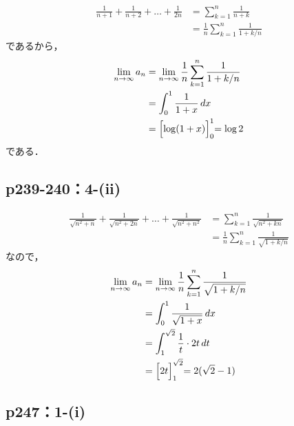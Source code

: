 \documentclass[uplatex,dvipdfmx,a4paper,10pt,fleqn]{jsarticle}
\begin{document}
\begin{tleftbar}
    \begin{align*} 
        \frac{1}{n+1}+ \frac{1}{n+2}+\dots + \frac{1}{2n} & = \sum_{k=1}^{n} \frac{1}{n+k} \\
        & = \frac{1}{n} \sum_{k=1}^{n} \frac{1}{1+k/n} 
    \end{align*}
    であるから，
    \begin{align*} 
        \lim_{n \to \infty} a_n &= \lim_{n \to \infty} \frac{1}{n} \sum_{k=1}^{n} \frac{1}{1+k/n} \\
        & = \int_{0}^{1} \frac{1}{1+x} \, dx \\
        & = \Bigl [ \log (1+x) \Bigl]_{0}^{1} = \log 2
    \end{align*}
    である．
\end{tleftbar}



\subsection*{p239-240：4-(ii)}

\begin{tleftbar}
    \begin{align*} 
        \frac{1}{\sqrt{n^2+n}}+\frac{1}{\sqrt{n^2+2n}}+\dots+\frac{1}{\sqrt{n^2+n^2}}& = \sum_{k=1}^{n} \frac{1}{\sqrt{n^2+kn}} \\
        & = \frac{1}{n} \sum_{k=1}^{n} \frac{1}{\sqrt{1+k/n}}
    \end{align*}
    なので，
    \begin{align*} 
        \lim_{n \to \infty} a_n &= \lim_{n \to \infty} \frac{1}{n} \sum_{k=1}^{n} \frac{1}{\sqrt{1+k/n}} \\
        & =\int_{0}^{1} \frac{1}{\sqrt{1+x}} \, dx \\
        & =\int_{1}^{\sqrt{2}} \frac{1}{t} \cdot 2t \, dt \\
        & = \Bigl[2t \Bigl ]_{1}^{\sqrt{2}} =2(\sqrt{2}-1)
    \end{align*}
\end{tleftbar}



\subsection*{p247：1-(i)}
\end{document}
